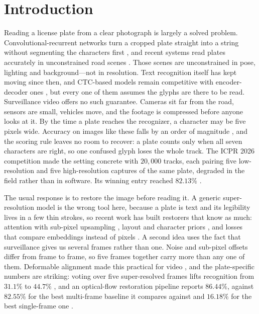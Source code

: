\documentclass[runningheads]{llncs}
\begin{document}
\section{Introduction}

Reading a license plate from a clear photograph is largely a solved problem. Convolutional-recurrent networks turn a cropped plate straight into a string without segmenting the characters first \cite{shi2017crnn}, and recent systems read plates accurately in unconstrained road scenes \cite{ke2023ultrafast}. Those scenes are unconstrained in pose, lighting and background---not in resolution. Text recognition itself has kept moving since then, and CTC-based models remain competitive with encoder-decoder ones \cite{du2025svtrv2}, but every one of them assumes the glyphs are there to be read. Surveillance video offers no such guarantee. Cameras sit far from the road, sensors are small, vehicles move, and the footage is compressed before anyone looks at it. By the time a plate reaches the recognizer, a character may be five pixels wide. Accuracy on images like these falls by an order of magnitude \cite{nascimento2025toward}, and the scoring rule leaves no room to recover: a plate counts only when all seven characters are right, so one confused glyph loses the whole track. The ICPR 2026 competition made the setting concrete with $20{,}000$ tracks, each pairing five low-resolution and five high-resolution captures of the same plate, degraded in the field rather than in software. Its winning entry reached $82.13\%$ \cite{laroca2026icpr}.

The usual response is to restore the image before reading it. A generic super-resolution model is the wrong tool here, because a plate is text and its legibility lives in a few thin strokes, so recent work has built restorers that know as much: attention with sub-pixel upsampling \cite{nascimento2023attention}, layout and character priors \cite{nascimento2024lcdnet}, and losses that compare embeddings instead of pixels \cite{sendjasni2025embedding}. A second idea uses the fact that surveillance gives us several frames rather than one. Noise and sub-pixel offsets differ from frame to frame, so five frames together carry more than any one of them. Deformable alignment made this practical for video \cite{wang2019edvr}, and the plate-specific numbers are striking: voting over five super-resolved frames lifts recognition from $31.1\%$ to $44.7\%$ \cite{nascimento2025toward}, and an optical-flow restoration pipeline reports $86.44\%$, against $82.55\%$ for the best multi-frame baseline it compares against and $16.18\%$ for the best single-frame one \cite{na2025mflpr2}.
\end{document}
